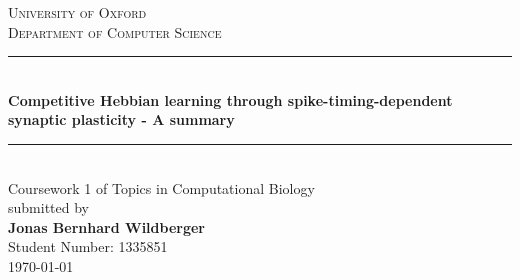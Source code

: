 \begin{titlepage}
	
	\begin{center}
		
		
		
		
		
		\textsc{\Large University of Oxford}\\[0.2cm]
		\textsc{Department of Computer Science}\\[0.2cm]
		\renewcommand{\HRule}{\rule{\linewidth}{0.5mm}}
		\HRule \\[.9cm]
		{ \huge \bfseries Competitive Hebbian learning through spike-timing-dependent synaptic plasticity - A summary}\\[0.6cm]
	
		\HRule \\[1.3cm]
		
		{\LARGE Coursework 1 of Topics in Computational Biology} \\[0.3cm]  
		
		
		submitted by \\[0.3cm]  
		{\large \bfseries Jonas Bernhard Wildberger} \\
		{Student Number: 1335851}
		\\[12.5cm]  
		
		{\large \today}	
	\end{center}
	
	
\end{titlepage}
